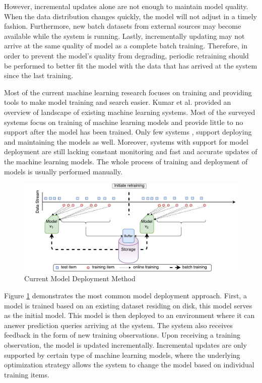 \documentclass{vldb}
\begin{document}
However, incremental updates alone are not enough to maintain model quality. 
When the data distribution changes quickly, the model will not adjust in a timely fashion. 
Furthermore, new batch datasets from external sources may become available while the system is running.
Lastly, incrementally updating may not arrive at the same quality of model as a complete batch training.
Therefore, in order to prevent the model's quality from degrading, periodic retraining should be performed to better fit the model with the data that has arrived at the system since the last training.

Most of the current machine learning research focuses on training and providing tools to make model training and search easier. 
Kumar et al. \cite{kumar2015survey} provided an overview of landscape of existing machine learning systems. 
Most of the surveyed systems focus on training of machine learning models and provide little to no support after the model has been trained.
Only few systems \cite{akdere2011case, crankshaw2014missing}, support deploying and maintaining the models as well.
Moreover, systems with support for model deployment are still lacking constant monitoring and fast and accurate updates of the machine learning models.
The whole process of training and deployment of models is usually performed manually.
\begin{figure}[t]
\centering
\includegraphics[width=.8\textwidth]{../images/velox-1.pdf}
\caption{Current Model Deployment Method}
\label{fig:velox-work-flow}
\end{figure}

Figure \ref{fig:velox-work-flow} demonstrates the most common model deployment approach.
First, a model is trained based on an existing dataset residing on disk, this model serves as the initial model.
This model is then deployed to an environment where it can answer prediction queries arriving at the system.
The system also receives feedback in the form of new training observations.
Upon receiving a training observation, the model is updated incrementally.
Incremental updates are only supported by certain type of machine learning models, where the underlying optimization strategy allows the system to change the model based on individual training items.
\end{document}

